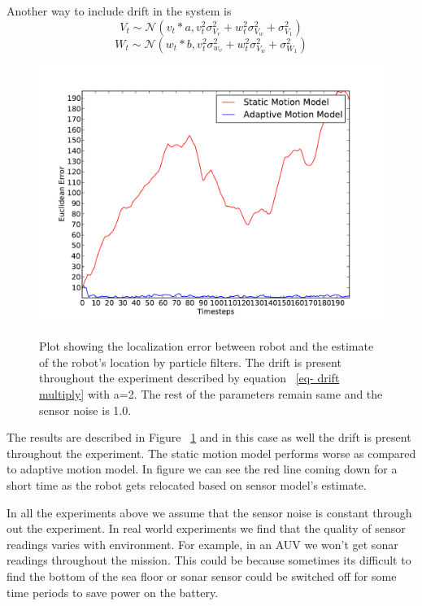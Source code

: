 \documentclass[12pt]{dalcsthesis}
\begin{document}
Another way to include drift in the system is 
\begin{equation}
\label{eq- drift multiply}
V_{t}\sim\mathcal{{N}}(v_{t}*a,v_{t}^{2}\sigma_{V_{v}}^{2}+w_{t}^{2}\sigma_{V_{w}}^{2}+\sigma_{V_{1}}^{2})
\end{equation}
\begin{equation}
W_{t}\sim\mathcal{{N}}(w_{t}*b,v_{t}^{2}\sigma_{w_{v}}^{2}+w_{t}^{2}\sigma_{V_{w}}^{2}+\sigma_{W_{1}}^{2})
\end{equation}

\begin{figure}[!ht]
  \centering
     {\includegraphics[height = 3.0 in]{./plots/200_005_005_s_10_traj_3_drift_20_multiply.pdf}}
  \caption{\label{fig-drift_multiply} Plot showing the localization error between robot and the estimate of the robot's location by particle filters. The drift is present throughout the experiment described by equation ~\ref{eq- drift multiply} with a=2. The rest of the parameters remain same and the sensor noise is 1.0. }
\end{figure}

The results are described in Figure ~\ref{fig-drift_multiply} and in this case as well the drift is present throughout the experiment. The static motion model performs worse as compared to adaptive motion model. In figure we can see the red line coming down for a short time as the robot gets relocated based on sensor model's estimate.     


In all the experiments above we assume that the sensor noise is constant through out the experiment. In real world experiments we find that the quality of sensor readings varies with environment. For example, in an AUV we won't get sonar readings throughout the mission. This could be because sometimes its difficult to find the bottom of the sea floor or sonar sensor could be switched off for some time periods to save power on the battery.
\end{document}
